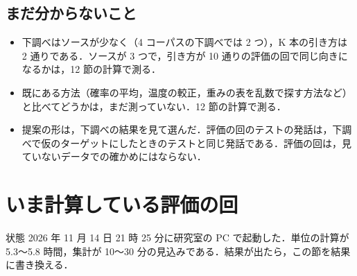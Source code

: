 \documentclass[a4paper,11pt]{ltjsarticle}
\begin{document}


\subsection*{まだ分からないこと}
\begin{itemize}
  \item 下調べはソースが少なく（4 コーパスの下調べでは 2 つ），K 本の引き方は 2 通りである．ソースが 3 つで，引き方が 10 通りの評価の回で同じ向きになるかは，12 節の計算で測る．
  \item 既にある方法（確率の平均，温度の較正，重みの表を乱数で探す方法など）と比べてどうかは，まだ測っていない．12 節の計算で測る．
  \item 提案の形は，下調べの結果を見て選んだ．評価の回のテストの発話は，下調べで仮のターゲットにしたときのテストと同じ発話である．評価の回は，見ていないデータでの確かめにはならない．
\end{itemize}

\section{いま計算している評価の回}

\begin{waku}{状態}
2026 年 11 月 14 日 21 時 25 分に研究室の PC で起動した．単位の計算が 5.3〜5.8 時間，集計が 10〜30 分の見込みである．結果が出たら，この節を結果に書き換える．
\end{waku}
\end{document}
